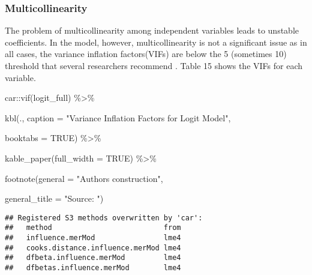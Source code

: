 \documentclass[a4paper,nobind]{templates/ociamthesis}
\newenvironment{Shaded}{\begin{snugshade}}{\end{snugshade}}
\newcommand{\AttributeTok}[1]{\textcolor[rgb]{0.77,0.63,0.00}{#1}}
\newcommand{\ConstantTok}[1]{\textcolor[rgb]{0.00,0.00,0.00}{#1}}
\newcommand{\FunctionTok}[1]{\textcolor[rgb]{0.00,0.00,0.00}{#1}}
\newcommand{\NormalTok}[1]{#1}
\newcommand{\SpecialCharTok}[1]{\textcolor[rgb]{0.00,0.00,0.00}{#1}}
\newcommand{\StringTok}[1]{\textcolor[rgb]{0.31,0.60,0.02}{#1}}
\renewenvironment{Shaded}
{
  \vspace{10pt}%
  \begin{snugshade}%
}{%
  \end{snugshade}%
  \vspace{8pt}%
}
\begin{document}
\elandscape

\hypertarget{multicollinearity}{%
\subsubsection{Multicollinearity}\label{multicollinearity}}

The problem of multicollinearity among independent variables leads to unstable coefficients. In the model, however, multicollinearity is not a significant issue as in all cases, the variance inflation factors(VIFs) are below the 5 (sometimes 10) threshold that several researchers recommend \autocite{gujarati2012econometrics}. Table 15 shows the VIFs for each variable.

\begin{Shaded}
\begin{Highlighting}[]
\NormalTok{car}\SpecialCharTok{::}\FunctionTok{vif}\NormalTok{(logit\_full) }\SpecialCharTok{\%\textgreater{}\%} 
  
  \FunctionTok{kbl}\NormalTok{(., }\AttributeTok{caption =} \StringTok{"Variance Inflation Factors for Logit Model"}\NormalTok{, }
      
      \AttributeTok{booktabs =} \ConstantTok{TRUE}\NormalTok{) }\SpecialCharTok{\%\textgreater{}\%} 
  
  \FunctionTok{kable\_paper}\NormalTok{(}\AttributeTok{full\_width =} \ConstantTok{TRUE}\NormalTok{) }\SpecialCharTok{\%\textgreater{}\%} 
  
  \FunctionTok{footnote}\NormalTok{(}\AttributeTok{general =} \StringTok{"Authors\textquotesingle{} construction"}\NormalTok{,}
           
           \AttributeTok{general\_title =} \StringTok{"Source: "}\NormalTok{)}
\end{Highlighting}
\end{Shaded}

\begin{verbatim}
## Registered S3 methods overwritten by 'car':
##   method                          from
##   influence.merMod                lme4
##   cooks.distance.influence.merMod lme4
##   dfbeta.influence.merMod         lme4
##   dfbetas.influence.merMod        lme4
\end{verbatim}
\end{document}
